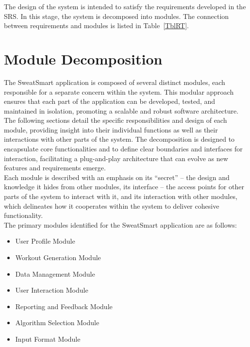 \documentclass[12pt, titlepage]{article}
\begin{document}
The design of the system is intended to satisfy the requirements developed in
the SRS. In this stage, the system is decomposed into modules. The connection
between requirements and modules is listed in Table~\ref{TblRT}.

\setlength{\parindent}{0cm}
\section{Module Decomposition} \label{SecMD}

The SweatSmart application is composed of several distinct modules, each responsible for a separate concern within the system. This modular approach ensures that each part of the application can be developed, tested, and maintained in isolation, promoting a scalable and robust software architecture. \\

The following sections detail the specific responsibilities and design of each module, providing insight into their individual functions as well as their interactions with other parts of the system. The decomposition is designed to encapsulate core functionalities and to define clear boundaries and interfaces for interaction, facilitating a plug-and-play architecture that can evolve as new features and requirements emerge.\\

Each module is described with an emphasis on its ``secret'' – the design and knowledge it hides from other modules, its interface – the access points for other parts of the system to interact with it, and its interaction with other modules, which delineates how it cooperates within the system to deliver cohesive functionality. \\

The primary modules identified for the SweatSmart application are as follows:

\begin{itemize}
    \item User Profile Module
    \item Workout Generation Module
    \item Data Management Module
    \item User Interaction Module
    \item Reporting and Feedback Module
    \item Algorithm Selection Module
    \item Input Format Module
\end{itemize}\\
\end{document}

